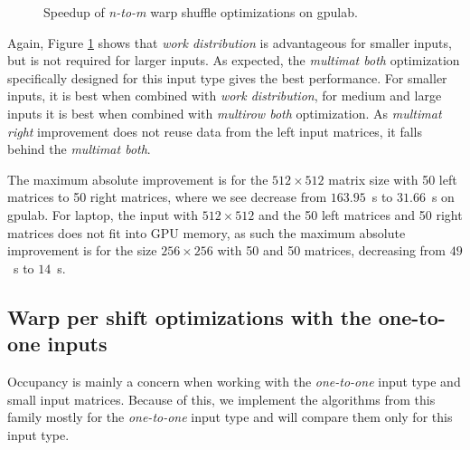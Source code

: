 \begin{figure}[ht]
	\centering	
	\begin{subfigure}{0.4\textwidth}
		\centering
		\def\svgwidth{\textwidth}
		
	\end{subfigure}
	\begin{subfigure}{0.4\textwidth}
		\centering
		\def\svgwidth{\textwidth}
		
	\end{subfigure}
	\hfill
	\begin{subfigure}{0.4\textwidth}
		\centering
		\def\svgwidth{\textwidth}
		
	\end{subfigure}
	
	\caption{Speedup of \textit{n-to-m} warp shuffle optimizations on gpulab.}
	\label{fig:warp_shuffle_n_to_m_results}
\end{figure}

Again, Figure \ref{fig:warp_shuffle_n_to_m_results} shows that \textit{work distribution} is advantageous for smaller inputs, but is not required for larger inputs. As expected, the \textit{multimat both} optimization specifically designed for this input type gives the best performance. For smaller inputs, it is best when combined with \textit{work distribution}, for medium and large inputs it is best when combined with \textit{multirow both} optimization. As \textit{multimat right} improvement does not reuse data from the left input matrices, it falls behind the \textit{multimat both}.

The maximum absolute improvement is for the $512 \times 512$ matrix size with 50 left matrices to 50 right matrices, where we see decrease from $163.95$~s to $31.66$~s on gpulab. For laptop, the input with $512 \times 512$ and the 50 left matrices and 50 right matrices does not fit into GPU memory, as such the maximum absolute improvement is for the size $256 \times 256$ with 50 and 50 matrices, decreasing from $49$~s to $14$~s.

\subsection{Warp per shift optimizations with the one-to-one inputs}
\label{sec:results_occupancy_improvements}

Occupancy is mainly a concern when working with the \textit{one-to-one} input type and small input matrices. Because of this, we implement the algorithms from this family mostly for the \textit{one-to-one} input type and will compare them only for this input type. 


